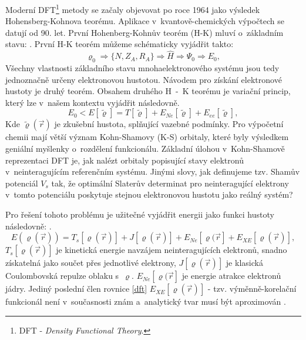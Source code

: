 \documentclass[
digital, %
table,   %
lof,     %
lot,     %
oneside,
]{fithesis3}
\begin{document}
Moderní DFT\footnote{DFT - \textit{Density Functional Theory}.} metody se začaly objevovat po roce 1964 jako výsledek Hohensberg-Kohnova teorému. Aplikace v~kvantově-chemických výpočtech se datují od 90. let. První Hohenberg-Kohnův teorém (H-K) mluví o~základním stavu: \cite{PhysRev.136.B864}. První H-K teorém můžeme schématicky vyjádřit takto:
\begin{equation}
\varrho_0 \Rightarrow \{N, Z_A, R_A\} \Rightarrow \widehat{H} \Rightarrow \Psi_0 \Rightarrow E_0,
\end{equation}
Všechny vlastnosti základního stavu mnohaelektronového systému jsou tedy jednoznačně určeny elektronovou hustotou. Návodem pro získání elektronové hustoty je druhý teorém. Obsahem druhého H~-~K teorému je variační princip, který lze v~našem kontextu vyjádřit následovně.
\begin{equation}
E_0 < E [\tilde{\varrho}] = T[\tilde{\varrho}] + E_{Ne}[\tilde{\varrho}] + E_{ee}[\tilde{\varrho}],
\end{equation}
Kde $\tilde{\varrho}(\vec{r})$ je zkušební hustota, splňující vazebné podmínky. Pro výpočetní chemii mají větší význam Kohn-Shamovy (K-S) orbitaly, které byly výsledkem geniální myšlenky o~rozdělení funkcionálu. Základní úlohou v~Kohn-Shamově reprezentaci DFT je, jak nalézt orbitaly popisující stavy elektronů v~neinteragujícím referenčním systému. Jinými slovy, jak definujeme tzv. Shamův potenciál $V_s$ tak, že optimální Slaterův determinat pro neinteragující elektrony v~tomto potenciálu poskytuje stejnou elektronovou hustotu jako reálný systém?

Pro řešení tohoto problému je užitečné vyjádřit energii jako funkci hustoty následovně:
\cite{jensen2007introduction}\cite{koch2000chemist}.
\begin{equation}
E(\varrho(\vec{r})) = T_s[\varrho(\vec{r})] + J[\varrho(\vec{r})] + E_{Ne}[\varrho(\vec{r}] + E_{XE}[\varrho(\vec{r})],
\label{dft}
\end{equation}
$T_s[\varrho(\vec{r})]$ je kinetická energie navzájem neinteragujících elektronů, snadno získatelná jako součet přes jednotlivé elektrony, $J[\varrho(\vec{r})]$ je klasická Coulombovská repulze oblaku s~$\varrho$.
$E_{Ne}[\varrho(\vec{r}]$ je energie atrakce elektronů jádry. Jediný poslední člen rovnice \ref{dft} $E_{XE}[\varrho(\vec{r})] $ - tzv. výměnně-korelační funkcionál není v~současnosti znám a~analytický tvar musí být aproximován \cite{parr1994density}.
\end{document}
